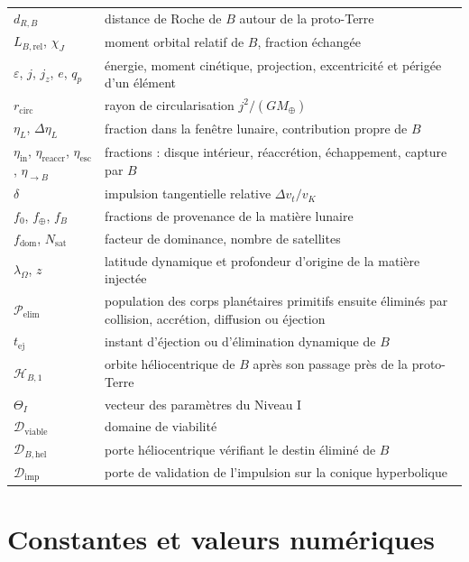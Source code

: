 \documentclass[11pt,a4paper,openany]{report}
\newcommand{\Mt}{M_{\oplus}}
\begin{document}
\begin{longtable}{>{\raggedright\arraybackslash}p{3.2cm}>{\raggedright\arraybackslash}p{11.6cm}}
$d_{R,B}$ & distance de Roche de $B$ autour de la proto-Terre \\
$L_{B,\mathrm{rel}}$, $\chi_J$ & moment orbital relatif de $B$, fraction échangée \\
$\varepsilon$, $j$, $j_z$, $e$, $q_p$ & énergie, moment cinétique, projection, excentricité et périgée d'un élément \\
$r_{\mathrm{circ}}$ & rayon de circularisation $j^2/(G\Mt)$ \\
$\eta_L$, $\Delta\eta_L$ & fraction dans la fenêtre lunaire, contribution propre de $B$ \\
$\eta_{\mathrm{in}}$, $\eta_{\mathrm{reaccr}}$, $\eta_{\mathrm{esc}}$, $\eta_{\to B}$ & fractions : disque intérieur, réaccrétion, échappement, capture par $B$ \\
$\delta$ & impulsion tangentielle relative $\Delta v_t/v_K$ \\
$f_0$, $f_\oplus$, $f_B$ & fractions de provenance de la matière lunaire \\
$f_{\mathrm{dom}}$, $N_{\mathrm{sat}}$ & facteur de dominance, nombre de satellites \\
$\lambda_\Omega$, $z$ & latitude dynamique et profondeur d'origine de la matière injectée \\
$\mathcal{P}_{\mathrm{elim}}$ & population des corps planétaires primitifs ensuite éliminés par collision, accrétion, diffusion ou éjection \\
$t_{\mathrm{ej}}$ & instant d'éjection ou d'élimination dynamique de $B$ \\
$\mathcal{H}_{B,1}$ & orbite héliocentrique de $B$ après son passage près de la proto-Terre \\
$\Theta_I$ & vecteur des paramètres du Niveau I \\
$\mathcal{D}_{\mathrm{viable}}$ & domaine de viabilité \\
$\mathcal{D}_{B,\mathrm{hel}}$ & porte héliocentrique vérifiant le destin éliminé de $B$ \\
$\mathcal{D}_{\mathrm{imp}}$ & porte de validation de l'impulsion sur la conique hyperbolique \\
\bottomrule
\end{longtable}
\normalsize

\chapter{Constantes et valeurs numériques}
\label{app:constantes}
\end{document}

